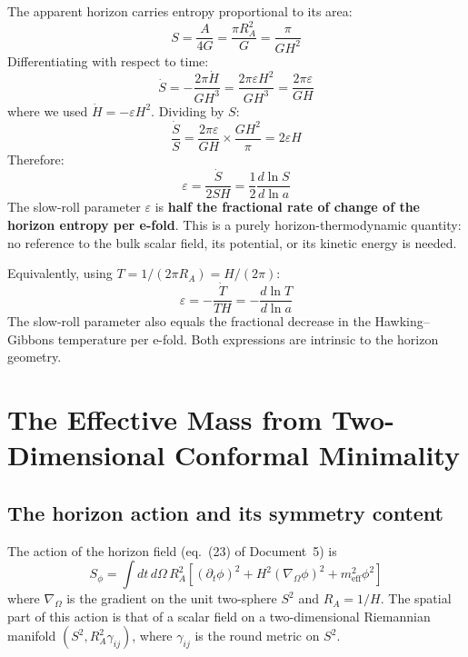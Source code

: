 \documentclass[12pt,a4paper]{article}
\begin{document}
The apparent horizon carries entropy proportional to its area:
\begin{equation}
S = \frac{A}{4G} = \frac{\pi R_A^2}{G} = \frac{\pi}{G H^2} \tag{3}
\end{equation}
Differentiating with respect to time:
\begin{equation}
\dot{S} = -\frac{2\pi \dot{H}}{G H^3} = \frac{2\pi \varepsilon H^2}{G H^3} = \frac{2\pi \varepsilon}{G H} \tag{4}
\end{equation}
where we used $\dot{H} = -\varepsilon H^2$. Dividing by $S$:
\begin{equation}
\frac{\dot{S}}{S} = \frac{2\pi\varepsilon}{GH} \times \frac{GH^2}{\pi} = 2\varepsilon H \tag{5}
\end{equation}
Therefore:
\begin{equation}
\varepsilon = \frac{\dot{S}}{2SH} = \frac{1}{2}\frac{d\ln S}{d\ln a} \tag{6}
\end{equation}
The slow-roll parameter $\varepsilon$ is \textbf{half the fractional rate of change of the horizon entropy per e-fold}. This is a purely horizon-thermodynamic quantity: no reference to the bulk scalar field, its potential, or its kinetic energy is needed.

Equivalently, using $T = 1/(2\pi R_A) = H/(2\pi)$:
\begin{equation}
\varepsilon = -\frac{\dot{T}}{TH} = -\frac{d\ln T}{d\ln a} \tag{7}
\end{equation}
The slow-roll parameter also equals the fractional decrease in the Hawking--Gibbons temperature per e-fold. Both expressions are intrinsic to the horizon geometry.

\section{The Effective Mass from Two-Dimensional Conformal Minimality}

\subsection{The horizon action and its symmetry content}

The action of the horizon field (eq.~(23) of Document~5) is
\begin{equation}
S_\phi = \int dt\, d\Omega\, R_A^2 \left[(\partial_t\phi)^2 + H^2(\nabla_\Omega\phi)^2 + m_\text{eff}^2\phi^2\right] \tag{8}
\end{equation}
where $\nabla_\Omega$ is the gradient on the unit two-sphere $S^2$ and $R_A = 1/H$. The spatial part of this action is that of a scalar field on a two-dimensional Riemannian manifold $(S^2, R_A^2 \gamma_{ij})$, where $\gamma_{ij}$ is the round metric on $S^2$.
\end{document}
